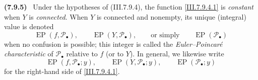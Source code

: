 \documentclass[10pt,oneside]{book}
\newcommand{\sh}[1]{\mathscr{#1}}
\newcommand{\sref}[2][]{(#2)}
\newenvironment{env}[1][]{\par\medskip\noindent\textbf{(#1)}\ }{\par}
\begin{document}
\begin{env}[7.9.5]
\label{III.7.9.5}
Under the hypotheses of \sref{III.7.9.4}, the function
\eqref{III.7.9.4.1} is \emph{constant} when $Y$ is
\emph{connected}.  When $Y$ is connected and nonempty, its
unique (integral) value is denoted
\[
  \operatorname{EP}(f,\sh{P}_\bullet),\qquad
  \operatorname{EP}(Y,\sh{P}_\bullet),
  \qquad\text{or simply}\qquad
  \operatorname{EP}(\sh{P}_\bullet)
\]
when no confusion is possible; this integer is called the
\emph{Euler--Poincar\'e characteristic} of
$\sh{P}_\bullet$ relative to $f$ (or to $Y$).  In general,
we likewise write
\[
  \operatorname{EP}(f,\sh{P}_\bullet;y),\qquad
  \operatorname{EP}(Y,\sh{P}_\bullet;y),\qquad
  \operatorname{EP}(\sh{P}_\bullet;y)
\]
for the right-hand side of \eqref{III.7.9.4.1}.
\end{env}
\end{document}
